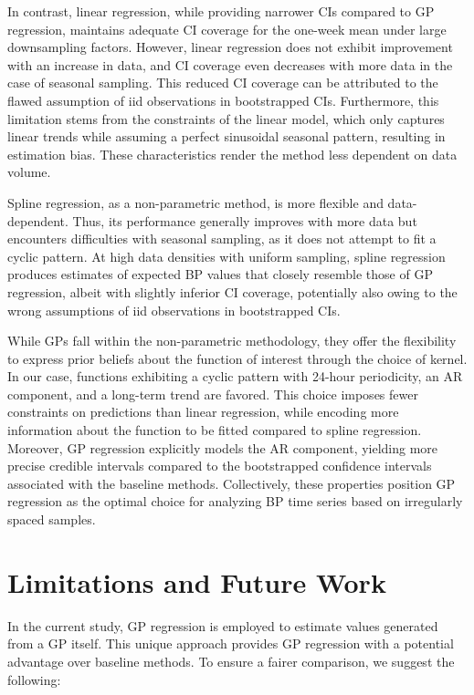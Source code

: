 In contrast, linear regression, while providing narrower CIs compared to GP regression,
maintains adequate CI coverage for the one-week mean under large downsampling factors.
However, linear regression does not exhibit improvement with an increase in data,
and CI coverage even decreases with more data in the case of seasonal sampling.
This reduced CI coverage can be attributed to the flawed assumption of iid observations in bootstrapped CIs.
Furthermore, this limitation stems from the constraints of the linear model,
which only captures linear trends while assuming a perfect sinusoidal seasonal pattern,
resulting in estimation bias.
These characteristics render the method less dependent on data volume.

Spline regression, as a non-parametric method, is more flexible and data-dependent.
Thus, its performance generally improves with more data but encounters
difficulties with seasonal sampling, as it does not attempt to fit a cyclic pattern.
At high data densities with uniform sampling, spline regression produces estimates
of expected BP values that closely resemble those of GP regression,
albeit with slightly inferior CI coverage, potentially also owing to the
wrong assumptions of iid observations in bootstrapped CIs.

While GPs fall within the non-parametric methodology, they offer the flexibility
to express prior beliefs about the function of interest through the choice of kernel.
In our case, functions exhibiting a cyclic pattern with 24-hour periodicity,
an AR component, and a long-term trend are favored.
This choice imposes fewer constraints on predictions than linear regression,
while encoding more information about the function to be fitted compared to spline regression.
Moreover, GP regression explicitly models the AR component, yielding more precise credible
intervals compared to the bootstrapped confidence intervals associated with the baseline methods.
Collectively, these properties position GP regression as the optimal choice for
analyzing BP time series based on irregularly spaced samples.


\section{Limitations and Future Work}

In the current study, GP regression is employed to estimate values generated from a GP itself.
This unique approach provides GP regression with a potential advantage over baseline methods.
To ensure a fairer comparison, we suggest the following:

